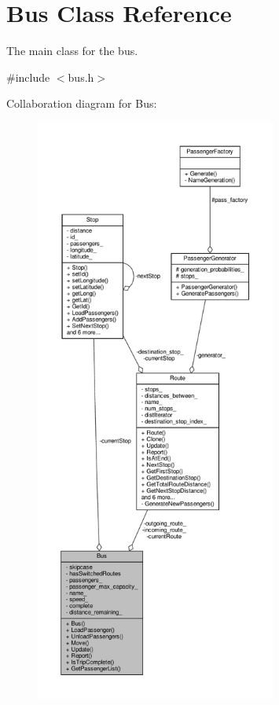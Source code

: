\hypertarget{classBus}{}\section{Bus Class Reference}
\label{classBus}


The main class for the bus.  




{\ttfamily \#include $<$bus.\+h$>$}



Collaboration diagram for Bus\+:\nopagebreak
\begin{figure}[H]
\begin{center}
\leavevmode
\includegraphics[height=550pt]{classBus__coll__graph}
\end{center}
\end{figure}
